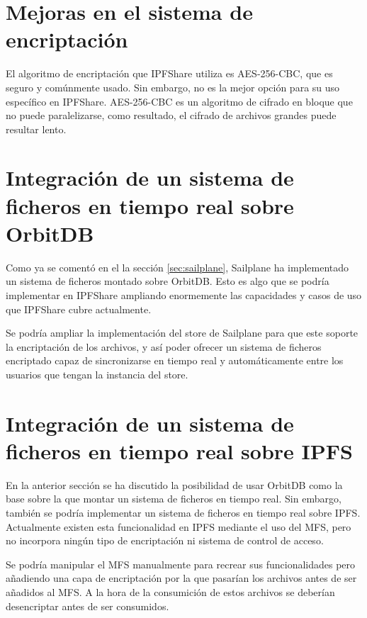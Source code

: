 \section{Mejoras en el sistema de encriptación}

El algoritmo de encriptación que IPFShare utiliza es AES-256-CBC, que es seguro y comúnmente usado. Sin embargo, no es la mejor opción para su uso específico en IPFShare. AES-256-CBC es un algoritmo de cifrado en bloque que no puede paralelizarse, como resultado, el cifrado de archivos grandes puede resultar lento.


\section{Integración de un sistema de ficheros en tiempo real sobre OrbitDB}
Como ya se comentó en el la sección \ref{sec:sailplane}, Sailplane ha implementado un sistema de ficheros montado sobre OrbitDB. Esto es algo que se podría implementar en IPFShare ampliando enormemente las capacidades y casos de uso que IPFShare cubre actualmente.

Se podría ampliar la implementación del store de Sailplane para que este soporte la encriptación de los archivos, y así poder ofrecer un sistema de ficheros encriptado capaz de sincronizarse en tiempo real y automáticamente entre los usuarios que tengan la instancia del store.

\section{Integración de un sistema de ficheros en tiempo real sobre IPFS}

En la anterior sección se ha discutido la posibilidad de usar OrbitDB como la base sobre la que montar un sistema de ficheros en tiempo real.
Sin embargo, también se podría implementar un sistema de ficheros en tiempo real sobre IPFS. Actualmente existen esta funcionalidad en IPFS
mediante el uso del MFS, pero no incorpora ningún tipo de encriptación ni sistema de control de acceso.

Se podría manipular el MFS manualmente para recrear sus funcionalidades pero añadiendo una capa de encriptación por la que pasarían los archivos antes de ser añadidos al MFS. A la hora de la consumición de estos archivos se deberían desencriptar antes de ser consumidos.
